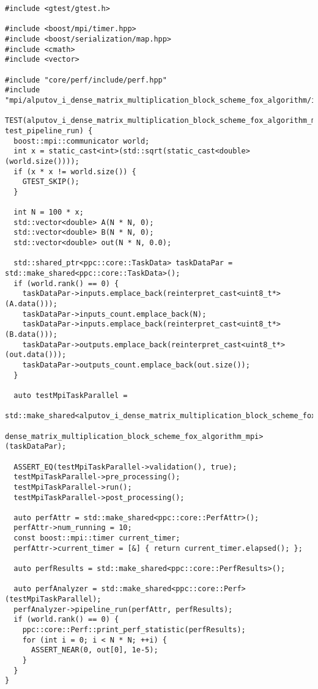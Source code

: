 \documentclass{report}
\begin{document}
\begin{lstlisting}[caption={main.cpp(perf tests)},label=lst:opsmpi2]
#include <gtest/gtest.h>

#include <boost/mpi/timer.hpp>
#include <boost/serialization/map.hpp>
#include <cmath>
#include <vector>

#include "core/perf/include/perf.hpp"
#include "mpi/alputov_i_dense_matrix_multiplication_block_scheme_fox_algorithm/include/ops_mpi.hpp"

TEST(alputov_i_dense_matrix_multiplication_block_scheme_fox_algorithm_mpi, test_pipeline_run) {
  boost::mpi::communicator world;
  int x = static_cast<int>(std::sqrt(static_cast<double>(world.size())));
  if (x * x != world.size()) {
    GTEST_SKIP();
  }

  int N = 100 * x;
  std::vector<double> A(N * N, 0);
  std::vector<double> B(N * N, 0);
  std::vector<double> out(N * N, 0.0);

  std::shared_ptr<ppc::core::TaskData> taskDataPar = std::make_shared<ppc::core::TaskData>();
  if (world.rank() == 0) {
    taskDataPar->inputs.emplace_back(reinterpret_cast<uint8_t*>(A.data()));
    taskDataPar->inputs_count.emplace_back(N);
    taskDataPar->inputs.emplace_back(reinterpret_cast<uint8_t*>(B.data()));
    taskDataPar->outputs.emplace_back(reinterpret_cast<uint8_t*>(out.data()));
    taskDataPar->outputs_count.emplace_back(out.size());
  }

  auto testMpiTaskParallel =
      std::make_shared<alputov_i_dense_matrix_multiplication_block_scheme_fox_algorithm::
                           dense_matrix_multiplication_block_scheme_fox_algorithm_mpi>(taskDataPar);

  ASSERT_EQ(testMpiTaskParallel->validation(), true);
  testMpiTaskParallel->pre_processing();
  testMpiTaskParallel->run();
  testMpiTaskParallel->post_processing();

  auto perfAttr = std::make_shared<ppc::core::PerfAttr>();
  perfAttr->num_running = 10;
  const boost::mpi::timer current_timer;
  perfAttr->current_timer = [&] { return current_timer.elapsed(); };

  auto perfResults = std::make_shared<ppc::core::PerfResults>();

  auto perfAnalyzer = std::make_shared<ppc::core::Perf>(testMpiTaskParallel);
  perfAnalyzer->pipeline_run(perfAttr, perfResults);
  if (world.rank() == 0) {
    ppc::core::Perf::print_perf_statistic(perfResults);
    for (int i = 0; i < N * N; ++i) {
      ASSERT_NEAR(0, out[0], 1e-5);
    }
  }
}


\end{lstlisting}
\end{document}
